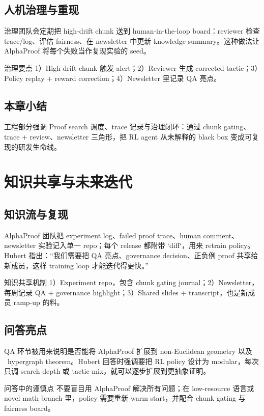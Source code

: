 \documentclass[a4paper]{article}
\begin{document}
\subsection{人机治理与重现}
治理团队会定期把 high-drift chunk 送到 human-in-the-loop board：reviewer 检查 trace/log、评估 fairness、在 newsletter 中更新 knowledge summary。这种做法让 AlphaProof 将每个失败当作复现实验的 seed。
\begin{knowledgebox}{治理要点}
1）High drift chunk 触发 alert；2）Reviewer 生成 corrected tactic；3）Policy replay + reward correction；4）Newsletter 里记录 QA 亮点。
\end{knowledgebox}

\subsection{本章小结}
工程部分强调 Proof search 调度、trace 记录与治理闭环：通过 chunk gating、trace + review、newsletter 三角形，把 RL agent 从未解释的 black box 变成可复现的研发生命线。
\newpage

\section{知识共享与未来迭代}

\subsection{知识流与复现}
AlphaProof 团队把 experiment log、failed proof trace、human comment、newsletter 实验记入单一 repo；每个 release 都附带 `diff`，用来 retrain policy。Hubert 指出：“我们需要把 QA 亮点、governance decision、正负例 proof 共享给新成员，这样 training loop 才能迭代得更快。”
\begin{importantbox}{知识共享机制}
1）Experiment repo，包含 chunk gating journal；2）Newsletter，每周记录 QA + governance highlight；3）Shared slides + transcript，也是新成员 ramp-up 的料。
\end{importantbox}

\subsection{问答亮点}
QA 环节被用来说明是否能将 AlphaProof 扩展到 non-Euclidean geometry 以及 ~hypergraph theorem。Hubert 回答时强调要把 RL policy 设计为 modular，每次只调 search depth 或 tactic mix，就可以逐步扩展到更抽象证明。
\begin{warningbox}{问答中的谨慎点}
不要盲目用 AlphaProof 解决所有问题；在 low-resource 语言或 novel math branch 里，policy 需要重新 warm start，并配合 chunk gating 与 fairness board。
\end{warningbox}
\end{document}
